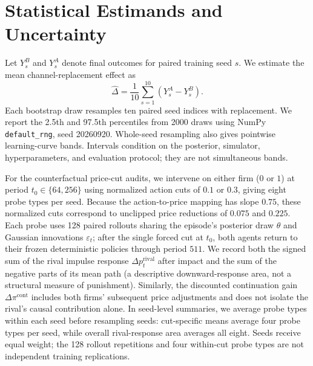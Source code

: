 \section{Statistical Estimands and Uncertainty}

Let $Y_s^B$ and $Y_s^A$ denote final outcomes for paired training seed $s$. We estimate the mean channel-replacement effect as
\[
\hat{\Delta} = \frac{1}{10}\sum_{s=1}^{10}(Y_s^A - Y_s^B).
\]
Each bootstrap draw resamples ten paired seed indices with replacement. We report the 2.5th and 97.5th percentiles from \num{2000} draws using NumPy \texttt{default\_rng}, seed 20260920. Whole-seed resampling also gives pointwise learning-curve bands. Intervals condition on the posterior, simulator, hyperparameters, and evaluation protocol; they are not simultaneous bands.

For the counterfactual price-cut audits, we intervene on either firm ($0$ or $1$) at period $t_0\in\{64, 256\}$ using normalized action cuts of $0.1$ or $0.3$, giving eight probe types per seed. Because the action-to-price mapping has slope $0.75$, these normalized cuts correspond to unclipped price reductions of $0.075$ and $0.225$. Each probe uses 128 paired rollouts sharing the episode's posterior draw $\theta$ and Gaussian innovations $\varepsilon_t$; after the single forced cut at $t_0$, both agents return to their frozen deterministic policies through period $511$. We record both the signed sum of the rival impulse response $\Delta p_t^{\mathrm{rival}}$ after impact and the sum of the negative parts of its mean path (a descriptive downward-response area, not a structural measure of punishment). Similarly, the discounted continuation gain $\Delta\pi^{\mathrm{cont}}$ includes both firms' subsequent price adjustments and does not isolate the rival's causal contribution alone. In seed-level summaries, we average probe types within each seed before resampling seeds: cut-specific means average four probe types per seed, while overall rival-response area averages all eight. Seeds receive equal weight; the 128 rollout repetitions and four within-cut probe types are not independent training replications.

